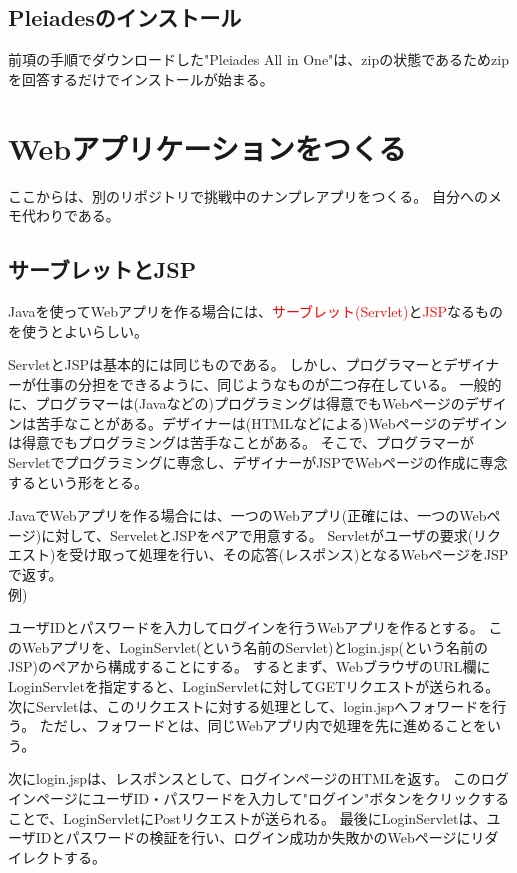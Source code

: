\documentclass[a4paper,10pt]{jsarticle}
\begin{document}
  \subsection{Pleiadesのインストール}
    前項の手順でダウンロードした"Pleiades All in One"は、zipの状態であるためzipを回答するだけでインストールが始まる。

\section{Webアプリケーションをつくる}
  ここからは、別のリポジトリで挑戦中のナンプレアプリをつくる。
  自分へのメモ代わりである。
  \subsection{サーブレットとJSP}
    Javaを使ってWebアプリを作る場合には、\textcolor{red}{サーブレット(Servlet)}と\textcolor{red}{JSP}なるものを使うとよいらしい。

    ServletとJSPは基本的には同じものである。
    しかし、プログラマーとデザイナーが仕事の分担をできるように、同じようなものが二つ存在している。
    一般的に、プログラマーは(Javaなどの)プログラミングは得意でもWebページのデザインは苦手なことがある。デザイナーは(HTMLなどによる)Webページのデザインは得意でもプログラミングは苦手なことがある。
    そこで、プログラマーがServletでプログラミングに専念し、デザイナーがJSPでWebページの作成に専念するという形をとる。

    JavaでWebアプリを作る場合には、一つのWebアプリ(正確には、一つのWebページ)に対して、ServeletとJSPをペアで用意する。
    Servletがユーザの要求(リクエスト)を受け取って処理を行い、その応答(レスポンス)となるWebページをJSPで返す。\\

    
    例)

    ユーザIDとパスワードを入力してログインを行うWebアプリを作るとする。
    このWebアプリを、LoginServlet(という名前のServlet)とlogin.jsp(という名前のJSP)のペアから構成することにする。
    するとまず、WebブラウザのURL欄にLoginServletを指定すると、LoginServletに対してGETリクエストが送られる。
    次にServletは、このリクエストに対する処理として、login.jspへフォワードを行う。
    ただし、フォワードとは、同じWebアプリ内で処理を先に進めることをいう。

    次にlogin.jspは、レスポンスとして、ログインページのHTMLを返す。
    このログインページにユーザID・パスワードを入力して"ログイン"ボタンをクリックすることで、LoginServletにPostリクエストが送られる。
    最後にLoginServletは、ユーザIDとパスワードの検証を行い、ログイン成功か失敗かのWebページにリダイレクトする。\\
\end{document}
